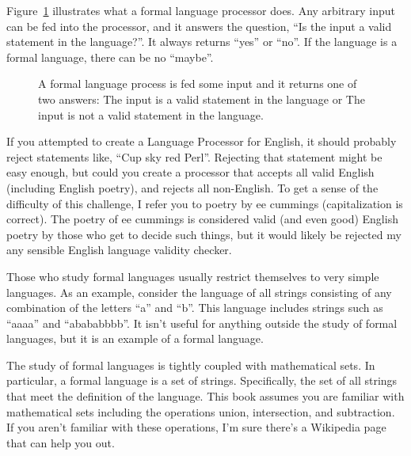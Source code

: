 \documentclass[letterpaper,12pt,openany,reqno]{book}%
\newcommand{\code}[1] {\lstinline[breaklines=yes,breakatwhitespace=yes]{#1}}
\begin{document}
Figure~\ref{F.formal.language.processor} illustrates what a formal language processor does. Any arbitrary input can be fed into the processor, and it answers the question, ``Is the input a valid statement in the language?''. It always returns ``yes'' or ``no''. If the language is a formal language, there can be no ``maybe''.

\begin{figure}[hbt]
\centering
{}
 \caption[Formal language processor]{A formal language process is fed some input and it returns one of two answers: The input is a valid statement in the language or The input is not a valid statement in the language.}
  \label{F.formal.language.processor}
\end{figure}

If you attempted to create a Language Processor for English, it should probably reject statements like, ``Cup sky red Perl''. Rejecting that statement might be easy enough, but could you create a processor that accepts all valid English (including English poetry), and rejects all non-English. To get a sense of the difficulty of this challenge, I refer you to poetry by ee cummings (capitalization is correct). The poetry of ee cummings is considered valid (and even good) English poetry by those who get to decide such things, but it would likely be rejected my any sensible English language validity checker.

Those who study formal languages usually restrict themselves to very simple languages. As an example, consider the language of all strings consisting of any combination of the letters ``a'' and ``b''. This language includes strings such as ``aaaa'' and ``abababbbb''. It isn't useful for anything outside the study of formal languages, but it is an example of a formal language.

The study of formal languages is tightly coupled with mathematical sets. In particular, a formal language is a set of strings. Specifically, the set of all strings that meet the definition of the language.  This book assumes you are familiar with mathematical sets including the operations union, intersection, and subtraction. If you aren't familiar with these operations, I'm sure there's a Wikipedia page that can help you out.
\end{document}
